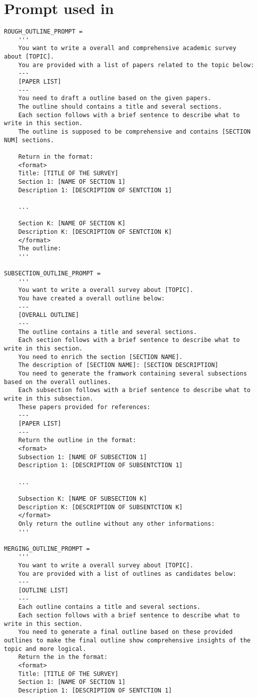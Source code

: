 \section{Prompt used in \ourmethod}
\label{appendix:prompt}
\begin{lstlisting}
ROUGH_OUTLINE_PROMPT = 
    '''
    You want to write a overall and comprehensive academic survey about [TOPIC].
    You are provided with a list of papers related to the topic below:
    ---
    [PAPER LIST]
    ---
    You need to draft a outline based on the given papers.
    The outline should contains a title and several sections.
    Each section follows with a brief sentence to describe what to write in this section.
    The outline is supposed to be comprehensive and contains [SECTION NUM] sections.
    
    Return in the format:
    <format>
    Title: [TITLE OF THE SURVEY]
    Section 1: [NAME OF SECTION 1]
    Description 1: [DESCRIPTION OF SENTCTION 1]
 
    ...
    
    Section K: [NAME OF SECTION K]
    Description K: [DESCRIPTION OF SENTCTION K]
    </format>
    The outline:
    '''

SUBSECTION_OUTLINE_PROMPT = 
    '''
    You want to write a overall survey about [TOPIC].
    You have created a overall outline below:
    ---
    [OVERALL OUTLINE]
    ---
    The outline contains a title and several sections.
    Each section follows with a brief sentence to describe what to write in this section.
    You need to enrich the section [SECTION NAME].
    The description of [SECTION NAME]: [SECTION DESCRIPTION]
    You need to generate the framwork containing several subsections based on the overall outlines.
    Each subsection follows with a brief sentence to describe what to write in this subsection.
    These papers provided for references:
    ---
    [PAPER LIST]
    ---
    Return the outline in the format:
    <format>
    Subsection 1: [NAME OF SUBSECTION 1]
    Description 1: [DESCRIPTION OF SUBSENTCTION 1]
    
    ...
    
    Subsection K: [NAME OF SUBSECTION K]
    Description K: [DESCRIPTION OF SUBSENTCTION K]
    </format>
    Only return the outline without any other informations:
    '''

MERGING_OUTLINE_PROMPT = 
    '''
    You want to write a overall survey about [TOPIC].
    You are provided with a list of outlines as candidates below:
    ---
    [OUTLINE LIST]
    ---
    Each outline contains a title and several sections.
    Each section follows with a brief sentence to describe what to write in this section.
    You need to generate a final outline based on these provided outlines to make the final outline show comprehensive insights of the topic and more logical.
    Return the in the format:
    <format>
    Title: [TITLE OF THE SURVEY]
    Section 1: [NAME OF SECTION 1]
    Description 1: [DESCRIPTION OF SENTCTION 1]
    

\end{lstlisting}
